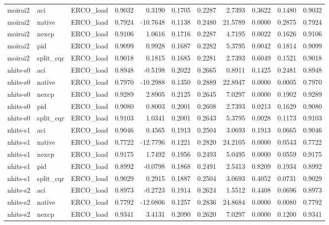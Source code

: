 \begin{tabular}{lllrrrrrrrr}
moirai2 & aci & ERCO_load & 0.9032 & 0.3190 & 0.1705 & 0.2287 & 2.7393 & 0.3622 & 0.1480 & 0.9032 \\
moirai2 & native & ERCO_load & 0.7924 & -10.7648 & 0.1138 & 0.2480 & 21.5789 & 0.0000 & 0.2875 & 0.7924 \\
moirai2 & nexcp & ERCO_load & 0.9106 & 1.0616 & 0.1716 & 0.2287 & 4.7195 & 0.0022 & 0.1626 & 0.9106 \\
moirai2 & pid & ERCO_load & 0.9099 & 0.9928 & 0.1687 & 0.2282 & 5.3795 & 0.0042 & 0.1814 & 0.9099 \\
moirai2 & split_cqr & ERCO_load & 0.9018 & 0.1815 & 0.1685 & 0.2281 & 2.7393 & 0.6049 & 0.1521 & 0.9018 \\
nhits-s0 & aci & ERCO_load & 0.8948 & -0.5198 & 0.2022 & 0.2665 & 0.8911 & 0.1425 & 0.2481 & 0.8948 \\
nhits-s0 & native & ERCO_load & 0.7970 & -10.2988 & 0.1350 & 0.2889 & 22.8947 & 0.0000 & 0.0005 & 0.7970 \\
nhits-s0 & nexcp & ERCO_load & 0.9289 & 2.8905 & 0.2125 & 0.2645 & 7.0297 & 0.0000 & 0.1902 & 0.9289 \\
nhits-s0 & pid & ERCO_load & 0.9080 & 0.8003 & 0.2001 & 0.2608 & 2.7393 & 0.0213 & 0.1629 & 0.9080 \\
nhits-s0 & split_cqr & ERCO_load & 0.9103 & 1.0341 & 0.2001 & 0.2643 & 5.3795 & 0.0028 & 0.1173 & 0.9103 \\
nhits-s1 & aci & ERCO_load & 0.9046 & 0.4565 & 0.1913 & 0.2504 & 3.0693 & 0.1913 & 0.0665 & 0.9046 \\
nhits-s1 & native & ERCO_load & 0.7722 & -12.7796 & 0.1221 & 0.2820 & 24.2105 & 0.0000 & 0.0543 & 0.7722 \\
nhits-s1 & nexcp & ERCO_load & 0.9175 & 1.7492 & 0.1956 & 0.2493 & 5.0495 & 0.0000 & 0.0559 & 0.9175 \\
nhits-s1 & pid & ERCO_load & 0.8992 & -0.0798 & 0.1868 & 0.2491 & 2.5413 & 0.8209 & 0.1934 & 0.8992 \\
nhits-s1 & split_cqr & ERCO_load & 0.9029 & 0.2915 & 0.1887 & 0.2504 & 3.0693 & 0.4052 & 0.0731 & 0.9029 \\
nhits-s2 & aci & ERCO_load & 0.8973 & -0.2723 & 0.1914 & 0.2624 & 1.5512 & 0.4408 & 0.0696 & 0.8973 \\
nhits-s2 & native & ERCO_load & 0.7792 & -12.0806 & 0.1257 & 0.2836 & 24.8684 & 0.0000 & 0.0080 & 0.7792 \\
nhits-s2 & nexcp & ERCO_load & 0.9341 & 3.4131 & 0.2090 & 0.2620 & 7.0297 & 0.0000 & 0.1200 & 0.9341 \\

\end{tabular}
